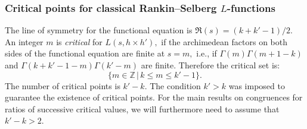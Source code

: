 \documentclass[11pt]{amsart}
\begin{document}
\smallskip
\subsubsection{Critical points for classical Rankin--Selberg $L$-functions}

The line of symmetry for the functional equation is $\Re(s) = (k+k'-1)/2.$  
An integer $m$ is {\it critical} for $L(s, h \times h'),$ if the archimedean factors on both sides of the functional equation are finite at $s = m,$ i.e., 
if $\Gamma(m)\Gamma(m+1-k)$ and $\Gamma(k+k' -1-m)\Gamma(k' -m)$ are finite. Therefore the critical set is:
\begin{equation}
\label{eqn:critical-set}
\{m \in \mathbb{Z} \,|\, k \leq m \leq k'-1\}.
\end{equation}
The number of critical points is $k'-k$. The condition $k' > k$ was imposed to guarantee the existence of critical points. 
For the main results on congruences for ratios of successive critical values, we will furthermore need to assume that $k'-k > 2.$
\end{document}
